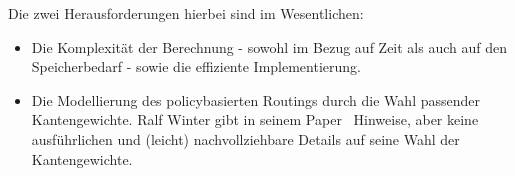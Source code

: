 Die zwei Herausforderungen hierbei sind im Wesentlichen:
\begin{itemize}
  \item Die Komplexität der Berechnung - sowohl im Bezug auf Zeit als auch auf den Speicherbedarf - sowie die effiziente Implementierung.
  \item Die Modellierung des policybasierten Routings durch die Wahl passender Kantengewichte. Ralf Winter gibt in seinem Paper~\cite{Winter:2009:MIR:1577959.1577976} Hinweise, aber keine ausführlichen und (leicht) nachvollziehbare Details auf seine Wahl der Kantengewichte.
\end{itemize}


